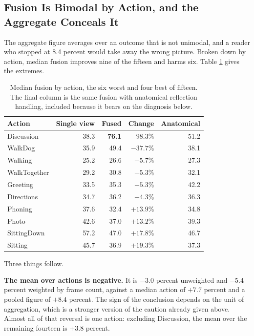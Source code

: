 \subsection{Fusion Is Bimodal by Action, and the Aggregate Conceals It}
\label{sec:fusionaction}

The aggregate figure averages over an outcome that is not unimodal, and a reader who stopped at 8.4 percent would take away the wrong picture. Broken down by action, median fusion improves nine of the fifteen and harms six. Table \ref{tab:fusionaction} gives the extremes.

\begin{table}[htbp]
\centering
\caption[Median fusion by action, the six worst and four best of fifteen]{Median fusion by action, the six worst and four best of fifteen. The final column is the same fusion with anatomical reflection handling, included because it bears on the diagnosis below.}
\label{tab:fusionaction}
{\fontsize{10}{12}\selectfont
\begin{tabular}{lrrrr}
\hline
\textbf{Action} & \textbf{Single view} & \textbf{Fused} & \textbf{Change} & \textbf{Anatomical} \\
\hline
Discussion & 38.3 & \textbf{76.1} & $\mathbf{-98.3\%}$ & 51.2 \\
WalkDog & 35.9 & 49.4 & $-37.7\%$ & 38.1 \\
Walking & 25.2 & 26.6 & $-5.7\%$ & 27.3 \\
WalkTogether & 29.2 & 30.8 & $-5.3\%$ & 32.1 \\
Greeting & 33.5 & 35.3 & $-5.3\%$ & 42.2 \\
Directions & 34.7 & 36.2 & $-4.3\%$ & 36.3 \\
\hline
Phoning & 37.6 & 32.4 & $+13.9\%$ & 34.8 \\
Photo & 42.6 & 37.0 & $+13.2\%$ & 39.3 \\
SittingDown & 57.2 & 47.0 & $+17.8\%$ & 46.7 \\
Sitting & 45.7 & 36.9 & $+19.3\%$ & 37.3 \\
\hline
\end{tabular}}
\end{table}

Three things follow.

\textbf{The mean over actions is negative.} It is $-3.0$ percent unweighted and $-5.4$ percent weighted by frame count, against a median action of $+7.7$ percent and a pooled figure of $+8.4$ percent. The sign of the conclusion depends on the unit of aggregation, which is a stronger version of the caution already given above. Almost all of that reversal is one action: excluding Discussion, the mean over the remaining fourteen is $+3.8$ percent.

